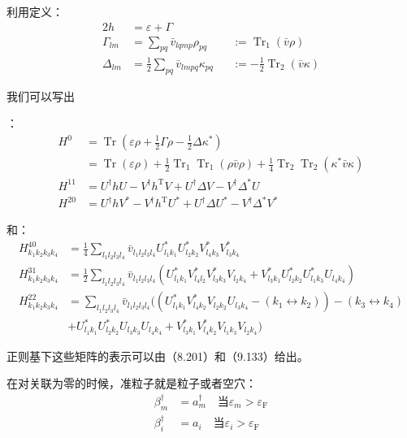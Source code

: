 利用定义：
\begin{alignat*}{2}
h & =\varepsilon+\Gamma\\
\Gamma_{lm} & =\sum_{pq}\bar{v}_{lqmp}\rho_{pq} &  & :=\mathop{\text{Tr}}_{1}(\bar{v}\rho)\\
\Delta_{lm} & =\frac{1}{2}\sum_{pq}\bar{v}_{lmpq}\kappa_{pq} &  & :=-\frac{1}{2}\mathop{\text{Tr}}_{2}(\bar{v}\kappa)
\end{alignat*}

我们可以写出

：
\begin{align*}
H^{0} & =\mathop{\text{Tr}}(\varepsilon\rho+\frac{1}{2}\Gamma\rho-\frac{1}{2}\Delta\kappa^{*})\\
 & =\mathop{\text{Tr}}(\varepsilon\rho)+\frac{1}{2}\mathop{\text{Tr}}_{1}\mathop{\text{Tr}}_{1}(\rho\bar{v}\rho)+\frac{1}{4}\mathop{\text{Tr}}_{2}\mathop{\text{Tr}}_{2}(\kappa^{*}\bar{v}\kappa)\\
H^{11} & =U^{\dagger}hU-V^{\dagger}h^{\mathrm{T}}V+U^{\dagger}\Delta V-V^{\dagger}\Delta^{*}U\\
H^{20} & =U^{\dagger}hV^{*}-V^{\dagger}h^{\mathrm{T}}U^{*}+U^{\dagger}\Delta U^{*}-V^{\dagger}\Delta^{*}V^{*}
\end{align*}

和：
\begin{align*}
H^{40}_{k_{1}k_{2}k_{3}k_{4}} & =\frac{1}{4}\sum_{l_{1}l_{2}l_{3}l_{4}}\bar{v}_{l_{1}l_{2}l_{3}l_{4}}U^{*}_{l_{1}k_{1}}U^{*}_{l_{2}k_{2}}V^{*}_{l_{4}k_{3}}V^{*}_{l_{3}k_{4}}\\
H^{31}_{k_{1}k_{2}k_{3}k_{4}} & =\frac{1}{2}\sum_{l_{1}l_{2}l_{3}l_{4}}\bar{v}_{l_{1}l_{2}l_{3}l_{4}}(U^{*}_{l_{1}k_{1}}V^{*}_{l_{4}l_{2}}V^{*}_{l_{3}k_{3}}V_{l_{2}k_{4}}+V^{*}_{l_{3}k_{1}}U^{*}_{l_{2}k_{2}}U^{*}_{l_{1}k_{3}}U_{l_{4}k_{4}})\\
H^{22}_{k_{1}k_{2}k_{3}k_{4}} & =\sum_{l_{1}l_{2}l_{3}l_{4}}\bar{v}_{l_{1}l_{2}l_{3}l_{4}}((U^{*}_{l_{1}k_{1}}V^{*}_{l_{4}k_{2}}V_{l_{2}k_{2}}U_{l_{3}k_{4}}-(k_{1}\leftrightarrow k_{2}))-(k_{3}\leftrightarrow k_{4})\\
 & +U^{*}_{l_{1}k_{1}}U^{*}_{l_{2}k_{2}}U_{l_{3}k_{3}}U_{l_{4}k_{4}}+V^{*}_{l_{3}k_{1}}V^{*}_{l_{4}k_{2}}V_{l_{1}k_{3}}V_{l_{2}k_{4}})
\end{align*}

正则基下这些矩阵的表示可以由（8.201）和（9.133）给出。

在对关联为零的时候，准粒子就是粒子或者空穴：
\begin{align*}
\beta^{\dagger}_{m} & =a^{\dagger}_{m}\quad\text{当}\varepsilon_{m}>\varepsilon_{\text{F}}\\
\beta^{\dagger}_{i} & =a_{i}\quad\text{当}\varepsilon_{i}>\varepsilon_{\text{F}}
\end{align*}

